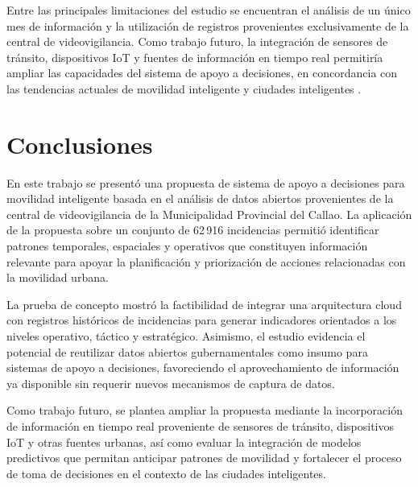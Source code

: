 \documentclass[]{IEEEphot}
\begin{document}
Entre las principales limitaciones del estudio se encuentran el análisis de un único mes de información y la utilización de registros provenientes exclusivamente de la central de videovigilancia. Como trabajo futuro, la integración de sensores de tránsito, dispositivos IoT y fuentes de información en tiempo real permitiría ampliar las capacidades del sistema de apoyo a decisiones, en concordancia con las tendencias actuales de movilidad inteligente y ciudades inteligentes \cite{mishra2025internet,de2021overview,maldonado2020smart}.

\section{Conclusiones}

En este trabajo se presentó una propuesta de sistema de apoyo a decisiones para movilidad inteligente basada en el análisis de datos abiertos provenientes de la central de videovigilancia de la Municipalidad Provincial del Callao. La aplicación de la propuesta sobre un conjunto de 62\,916 incidencias permitió identificar patrones temporales, espaciales y operativos que constituyen información relevante para apoyar la planificación y priorización de acciones relacionadas con la movilidad urbana.

La prueba de concepto mostró la factibilidad de integrar una arquitectura cloud con registros históricos de incidencias para generar indicadores orientados a los niveles operativo, táctico y estratégico. Asimismo, el estudio evidencia el potencial de reutilizar datos abiertos gubernamentales como insumo para sistemas de apoyo a decisiones, favoreciendo el aprovechamiento de información ya disponible sin requerir nuevos mecanismos de captura de datos.

Como trabajo futuro, se plantea ampliar la propuesta mediante la incorporación de información en tiempo real proveniente de sensores de tránsito, dispositivos IoT y otras fuentes urbanas, así como evaluar la integración de modelos predictivos que permitan anticipar patrones de movilidad y fortalecer el proceso de toma de decisiones en el contexto de las ciudades inteligentes.






\end{document}

